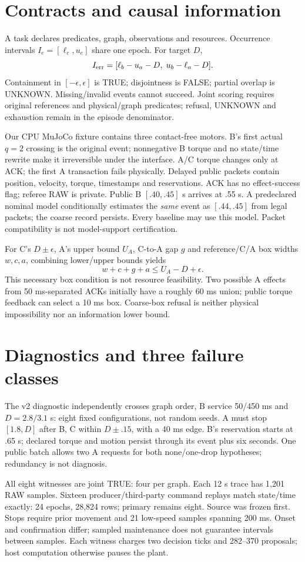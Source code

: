 \documentclass{article}
\begin{document}
\section{Contracts and causal information}
A task declares predicates, graph, observations and resources.
Occurrence intervals $I_e=[\ell_e,u_e]$ share one epoch. For target $D$,
\[
 I_{\rm err}=[\ell_b-u_a-D,\;u_b-\ell_a-D].
\]
Containment in $[-\epsilon,\epsilon]$ is TRUE; disjointness is FALSE;
partial overlap is UNKNOWN. Missing/invalid events cannot succeed.
Joint scoring requires original references and physical/graph predicates;
refusal, UNKNOWN and exhaustion remain in the episode denominator.

Our CPU MuJoCo fixture contains three contact-free motors. B's first
actual $q=2$ crossing is the original event; nonnegative B torque and
no state/time rewrite make it irreversible under the interface.
A/C torque changes only at ACK; the first A transaction fails physically.
Delayed public packets contain position, velocity, torque, timestamps
and reservations. ACK has no effect-success flag; referee RAW is private.
Public B $[.40,.45]$ s arrives at .55 s. A predeclared nominal model
conditionally estimates the \emph{same} event as $[.44,.45]$ from legal
packets; the coarse record persists. Every baseline may use this model.
Packet compatibility is not model-support certification.

For C's $D\pm\epsilon$, A's upper bound $U_A$, C-to-A gap $g$ and
reference/C/A box widths $w,c,a$, combining lower/upper bounds yields
\[
 w+c+g+a\le U_A-D+\epsilon.
\]
This necessary box condition is not resource feasibility. Two possible
A effects from 50 ms-separated ACKs initially have a roughly 60 ms
union; public torque feedback can select a 10 ms box. Coarse-box refusal
is neither physical impossibility nor an information lower bound.

\section{Diagnostics and three failure classes}
The v2 diagnostic independently crosses graph order, B service
50/450 ms and $D=2.8/3.1$ s: eight fixed configurations, not random seeds.
A must stop $[1.8,D]$ after B, C within $D\pm .15$, with a 40 ms edge.
B's reservation starts at .65 s; declared torque and motion persist
through its event plus six seconds. One public batch allows two A
requests for both none/one-drop hypotheses; redundancy is not diagnosis.

All eight witnesses are joint TRUE: four per graph. Each 12 s trace
has 1,201 RAW samples. Sixteen producer/third-party command replays
match state/time exactly: 24 epochs, 28,824 rows; primary remains eight.
Source was frozen first. Stops require prior
movement and 21 low-speed samples spanning 200 ms. Onset and
confirmation differ; sampled maintenance does not guarantee intervals
between samples. Each witness charges two decision ticks and 282--370 proposals;
host computation otherwise pauses the plant.
\end{document}
